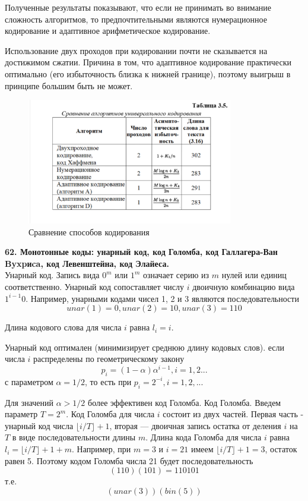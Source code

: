 \documentclass[14pt]{article}
\begin{document}
Полученные результаты показывают, что если не принимать во внимание сложность алгоритмов, то предпочтительными являются нумерационное кодирование и адаптивное арифметическое кодирование.

Использование двух проходов при кодировании почти не сказывается на достижимом сжатии. Причина в том, что адаптивное кодирование практически оптимально (его избыточность близка к нижней границе), поэтому выигрыш в принципе большим быть не может.

\begin{figure}[h!]
\centering
    \includegraphics[width=90mm]{compare.png}
\caption{Сравнение способов кодирования}
\end{figure}

\bigskip
\textbf{62. Монотонные коды: унарный код, код Голомба, код Галлагера-Ван Byxpиca, код Левенштейна, код Элайеса.} \\

Унарный код. Запись вида \(0^m\) или \(1^m\) означает серию из \(m\) нулей или единиц соответственно. Унарный код сопоставляет числу \(i\) двоичную комбинацию вида \(1^{i-1}0\). Например, унарными кодами чисел 1, 2 и 3 являются последовательности \[unar(1)=0, unar(2)=10, unar(3)=110\]

Длина кодового слова для числа \(i\) равна \(l_i = i\).

Унарный код оптимален (минимизирует среднюю длину кодовых слов). если числа \(i\) распределены по геометрическому закону \[p_i = (1 - \alpha)\alpha^{i-1}, i = 1, 2...\] с параметром \(\alpha = 1/2\), то есть при \(p_i = 2^{-i}, i = 1, 2, ...\)

Для значений \(\alpha > 1/2\) более эффективен код Голомба. Код Голомба. Введем параметр \(T = 2^m\). Код Голомба для числа \(i\) состоит из двух частей. Первая часть - унарный код числа \(\lfloor i/T \rfloor + 1\), вторая — двоичная запись остатка от деления \(i\) на \(T\) в виде последовательности длины \(m\). Длина кода Голомба для числа \(i\) равна \(l_i = \lfloor i/T \rfloor + 1 + m\). Например, при \(m = 3\) и \(i = 21\) имеем \(\lfloor i/T \rfloor + 1 = 3\), остаток равен 5. Поэтому кодом Голомба числа 21 будет последовательность
\begin{displaymath}
    (110)(101)= 110101
\end{displaymath}
т.е.
\begin{displaymath}
    (unar(3))(bin(5))
\end{displaymath}
\end{document}
